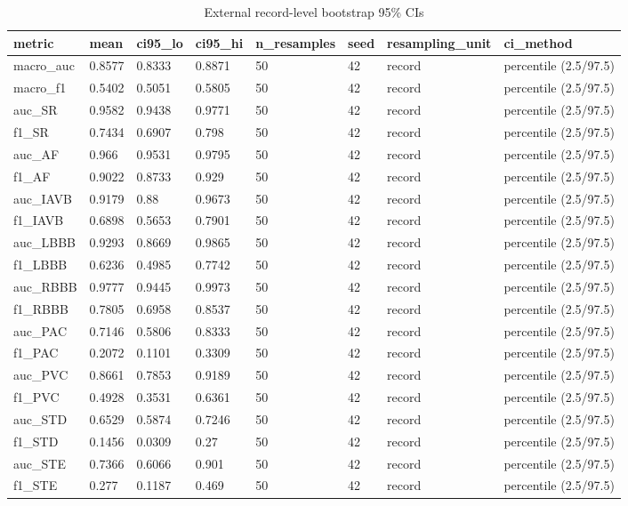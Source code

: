 \begin{table}[htbp]\centering\small
\caption{External record-level bootstrap 95\% CIs}\label{tab:extci}
\begin{tabular}{llllllll}
\hline
metric & mean & ci95_lo & ci95_hi & n_resamples & seed & resampling_unit & ci_method \\
\hline
macro_auc & 0.8577 & 0.8333 & 0.8871 & 50 & 42 & record & percentile (2.5/97.5) \\
macro_f1 & 0.5402 & 0.5051 & 0.5805 & 50 & 42 & record & percentile (2.5/97.5) \\
auc_SR & 0.9582 & 0.9438 & 0.9771 & 50 & 42 & record & percentile (2.5/97.5) \\
f1_SR & 0.7434 & 0.6907 & 0.798 & 50 & 42 & record & percentile (2.5/97.5) \\
auc_AF & 0.966 & 0.9531 & 0.9795 & 50 & 42 & record & percentile (2.5/97.5) \\
f1_AF & 0.9022 & 0.8733 & 0.929 & 50 & 42 & record & percentile (2.5/97.5) \\
auc_IAVB & 0.9179 & 0.88 & 0.9673 & 50 & 42 & record & percentile (2.5/97.5) \\
f1_IAVB & 0.6898 & 0.5653 & 0.7901 & 50 & 42 & record & percentile (2.5/97.5) \\
auc_LBBB & 0.9293 & 0.8669 & 0.9865 & 50 & 42 & record & percentile (2.5/97.5) \\
f1_LBBB & 0.6236 & 0.4985 & 0.7742 & 50 & 42 & record & percentile (2.5/97.5) \\
auc_RBBB & 0.9777 & 0.9445 & 0.9973 & 50 & 42 & record & percentile (2.5/97.5) \\
f1_RBBB & 0.7805 & 0.6958 & 0.8537 & 50 & 42 & record & percentile (2.5/97.5) \\
auc_PAC & 0.7146 & 0.5806 & 0.8333 & 50 & 42 & record & percentile (2.5/97.5) \\
f1_PAC & 0.2072 & 0.1101 & 0.3309 & 50 & 42 & record & percentile (2.5/97.5) \\
auc_PVC & 0.8661 & 0.7853 & 0.9189 & 50 & 42 & record & percentile (2.5/97.5) \\
f1_PVC & 0.4928 & 0.3531 & 0.6361 & 50 & 42 & record & percentile (2.5/97.5) \\
auc_STD & 0.6529 & 0.5874 & 0.7246 & 50 & 42 & record & percentile (2.5/97.5) \\
f1_STD & 0.1456 & 0.0309 & 0.27 & 50 & 42 & record & percentile (2.5/97.5) \\
auc_STE & 0.7366 & 0.6066 & 0.901 & 50 & 42 & record & percentile (2.5/97.5) \\
f1_STE & 0.277 & 0.1187 & 0.469 & 50 & 42 & record & percentile (2.5/97.5) \\
\hline
\end{tabular}
\end{table}
